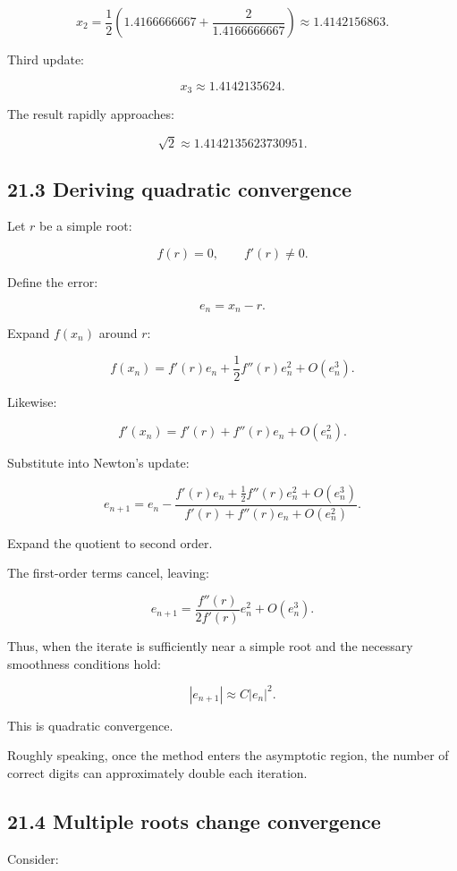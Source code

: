 \[ x_2= \frac12\left(1.4166666667+\frac2{1.4166666667}\right) \approx \boxed{1.4142156863}. \]

Third update:

\[ x_3\approx1.4142135624. \]

The result rapidly approaches:

\[ \sqrt2\approx1.4142135623730951. \]

\subsection{21.3 Deriving quadratic convergence}\label{02-foundations-ii-ch028-deriving-quadratic-convergence}

Let \(r\) be a simple root:

\[ f(r)=0,\qquad f'(r)\ne0. \]

Define the error:

\[ e_n=x_n-r. \]

Expand \(f(x_n)\) around \(r\):

\[ f(x_n) = f'(r)e_n+ \frac12f''(r)e_n^2+ O(e_n^3). \]

Likewise:

\[ f'(x_n) = f'(r)+f''(r)e_n+O(e_n^2). \]

Substitute into Newton's update:

\[ e_{n+1} = e_n- \frac{ f'(r)e_n+\frac12f''(r)e_n^2+O(e_n^3) }{ f'(r)+f''(r)e_n+O(e_n^2) }. \]

Expand the quotient to second order.

The first-order terms cancel, leaving:

\[ \boxed{ e_{n+1} = \frac{f''(r)}{2f'(r)}e_n^2 + O(e_n^3) }. \]

Thus, when the iterate is sufficiently near a simple root and the necessary smoothness conditions hold:

\[ \boxed{ |e_{n+1}|\approx C|e_n|^2 }. \]

This is quadratic convergence.

Roughly speaking, once the method enters the asymptotic region, the number of correct digits can approximately double each iteration.

\subsection{21.4 Multiple roots change convergence}\label{02-foundations-ii-ch028-multiple-roots-change-convergence}

Consider:

